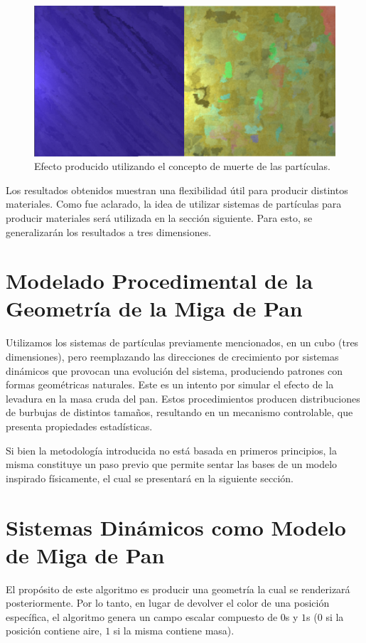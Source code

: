 \begin{figure}[t!]
\centering
\includegraphics[scale=0.2]{muerte}
\caption{Efecto producido utilizando el concepto de muerte de las partículas.}
\label{muerte}
\end{figure}

Los resultados obtenidos muestran una flexibilidad útil para producir distintos materiales.
Como fue aclarado, la idea de utilizar sistemas de partículas para producir materiales será utilizada en la sección siguiente.
Para esto, se generalizarán los resultados a tres dimensiones.

\section{Modelado Procedimental de la Geometría de la Miga de Pan}


Utilizamos los sistemas de partículas previamente mencionados, en un cubo (tres dimensiones), pero reemplazando las direcciones de crecimiento por sistemas dinámicos \cite{Strogatz2001} que provocan una evolución del sistema, produciendo patrones con formas geométricas naturales.
Este es un intento por simular el efecto de la levadura en la masa cruda del pan.
Estos procedimientos producen distribuciones de burbujas de distintos tamaños, resultando en un mecanismo controlable, que presenta propiedades estadísticas.

Si bien la metodología introducida no está basada en primeros principios, la misma constituye un paso previo que permite sentar las bases de un modelo inspirado físicamente, el cual se presentará en la siguiente sección.

\section{Sistemas Dinámicos como Modelo de Miga de Pan}
El propósito de este algoritmo es producir una geometr\'ia la cual se renderizar\'a posteriormente. Por lo tanto, en lugar de devolver el color de una posici\'on espec\'ifica, el algoritmo genera un campo escalar compuesto de $0$s y $1$s ($0$ si la posici\'on contiene aire, $1$ si la misma contiene masa).

